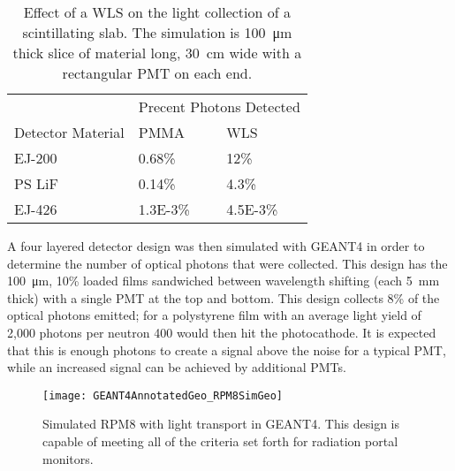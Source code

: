   \begin{table}
  \caption[Light Collection Increase with a WLS Bar]{Effect of a WLS on the light collection of a scintillating slab. The simulation is \SI{100}{\um} thick slice of material  long, \SI{30}{\cm} wide with a rectangular PMT on each end.}
  \label{tab:WLSStudy}
  \begin{tabular}{p{4cm} m{3cm} m{3cm}}
  \toprule
  & \multicolumn{2}{c}{Precent Photons Detected} \\
  Detector Material & PMMA &  WLS \\
  \midrule
 EJ-200 & 0.68\%  & 12\% \\
 PS LiF & 0.14\% & 4.3\% \\
 EJ-426 & \num{1.3E-3}\% & \num{4.5E-3}\% \\
 \bottomrule
  \end{tabular}
\end{table}

A four layered detector design was then simulated with GEANT4 in order to determine the number of optical photons that were collected.
This design has the \SI{100}{\um}, 10\% loaded  films sandwiched between wavelength shifting (each \SI{5}{\mm} thick) with a single PMT at the top and bottom.
This design collects 8\% of the optical photons emitted; for a polystyrene film with an average light yield of 2,000 photons per neutron 400 would then hit the photocathode.
It is expected that this is enough photons to create a signal above the noise for a typical PMT, while an increased signal can be achieved by additional PMTs.
\begin{figure}
  \centering
	\texttt{[image: GEANT4AnnotatedGeo\_RPM8SimGeo]}
	  \caption[GEANT4 Simulated RPM8 Detector Design]{Simulated RPM8 with light transport in GEANT4. This design is capable of meeting all of the criteria set forth for radiation portal monitors.}
  \label{fig:G4RPM8Geo}
\end{figure}


